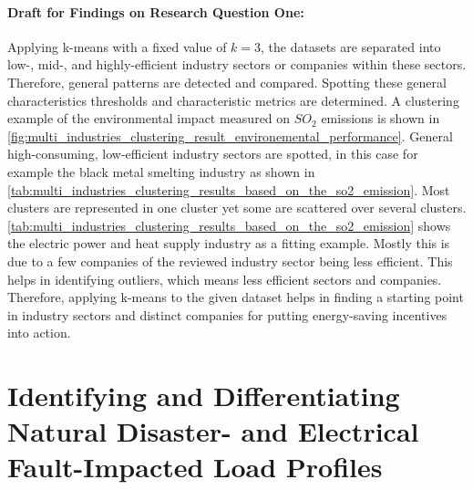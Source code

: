 \paragraph*{Draft for Findings on Research Question One:}
Applying k-means with a fixed value of $k=3$, the datasets are separated into low-, mid-, and highly-efficient industry sectors or companies within these sectors.
Therefore, general patterns are detected and compared.
Spotting these general characteristics thresholds and characteristic metrics are determined.
A clustering example of the environmental impact measured on $SO_2$ emissions is shown in \autoref{fig:multi_industries_clustering_result_environemental_performance}.
General high-consuming, low-efficient industry sectors are spotted, in this case for example the black metal smelting industry as shown in \autoref{tab:multi_industries_clustering_results_based_on_the_so2_emission}.
Most clusters are represented in one cluster yet some are scattered over several clusters.
\autoref{tab:multi_industries_clustering_results_based_on_the_so2_emission} shows the electric power and heat supply industry as a fitting example.
Mostly this is due to a few companies of the reviewed industry sector being less efficient.
This helps in identifying outliers, which means less efficient sectors and companies.
Therefore, applying k-means to the given dataset helps in finding a starting point in industry sectors and distinct companies for putting energy-saving incentives into action.

\section{Identifying and Differentiating Natural Disaster- and Electrical Fault-Impacted Load Profiles}
\label{sec:identifying_and_differentiating_natural_disaster_and_electrical_fault_impacted_load_profiles}
